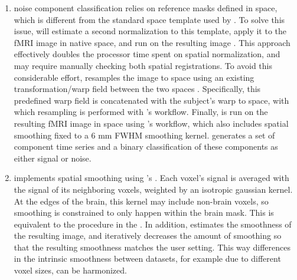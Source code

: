 \begin{enumerate}[leftmargin=*]

\item

 noise component classification
\parencite{10.1016/j.neuroimage.2015.02.064} relies on reference masks defined
in  space, which is different from the standard space
template used by . To solve this issue,  will
estimate a second normalization to this template, apply it to the fMRI
image in native space, and run  on the resulting image
\parencite{10.1101/2021.02.10.430678}. This approach effectively doubles the
processor time spent on spatial normalization, and may require manually
checking both spatial registrations. To avoid this considerable effort,
 resamples the image to  space using
an existing transformation/warp field between the two spaces
\parencite{horn_transform}. Specifically, this predefined warp field is
concatenated with the subject's warp to  space,
with which resampling is performed with 's
 workflow. Finally,  is run on the
resulting fMRI image in  space using
's  workflow, which also includes spatial
smoothing fixed to a 6 mm FWHM smoothing kernel.  generates a set
of component time series and a binary classification of these components as
either signal or noise.

\item

 implements spatial smoothing using 's
 \parencite{friedman_reducing_2006}.
Each voxel's signal is averaged with the signal of its neighboring voxels, 
weighted by an isotropic gaussian kernel. At the edges of the brain, this
kernel may include non-brain voxels, so smoothing is constrained to only
happen within the brain mask. This is equivalent to the procedure in the
\parencite{10.1016/j.neuroimage.2013.04.127}. In addition,
 estimates the smoothness of the resulting image, and
iteratively decreases the amount of smoothing so that the resulting 
smoothness matches the user setting. This way differences in the intrinsic
smoothness between datasets, for example due to different voxel sizes, can
be harmonized.


\end{enumerate}
